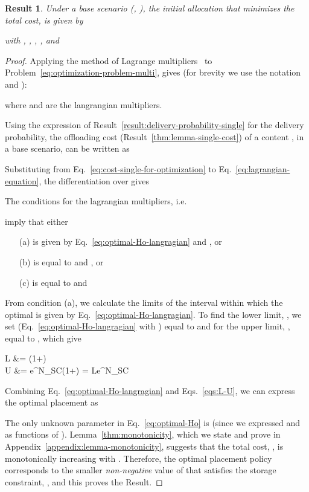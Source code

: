\documentclass[10pt,conference,letterpaper]{IEEEtran}
\newtheorem{result}{Result}
\newcommand{\eq}[1]{Eq.~\eqref{#1}}
\newcommand{\eqs}[1]{Eqs.~\eqref{#1}}
\begin{document}
\begin{result}\label{THM:OPTIMAL-H0-NO-COOP-MULTIPLE}
Under a base scenario (, ), the initial allocation  that minimizes the total cost, is given by

with  , , , , and 

\end{result}
\begin{proof}
Applying the method of Lagrange multipliers~\cite{practical-optimization-book} to Problem~\ref{eq:optimization-problem-multi}, gives (for brevity we use the notation  and ):

where  and  are the langrangian multipliers.

Using the expression of Result~\ref{result:delivery-probability-single} for the delivery probability, the offloading cost (Result~\ref{thm:lemma-single-cost}) of a content , in a base scenario, can be written as


Substituting  from \eq{eq:cost-single-for-optimization} to \eq{eq:lagrangian-equation}, the differentiation over  gives


\noindent The conditions for the lagrangian multipliers, i.e.

imply that  either 
\begin{itemize}
\item[(a)] is given by \eq{eq:optimal-Ho-langragian} and , or
\item[(b)] is equal to  and , or 
\item[(c)] is equal to  and  
\end{itemize}

From condition (a), we calculate the limits of the interval within which the optimal  is given by \eq{eq:optimal-Ho-langragian}. To find the lower limit, , we set  (\eq{eq:optimal-Ho-langragian} with ) equal to  and for the upper limit, , equal to , which give

 L &= \cdot\left(1+\right)		\label{eq:L-low-limit}\\
U &= \cdot e^{\gamma\cdot N_{SC}}\cdot\left(1+\right)		\label{eq:U-upper-limit}= L\cdot e^{\gamma\cdot N_{SC}}


Combining \eq{eq:optimal-Ho-langragian} and \eqs{eqs:L-U}, we can express the optimal placement as


The only unknown parameter in \eq{eq:optimal-Ho} is  (since we expressed  and  as functions of ). Lemma~\ref{thm:monotonicity}, which we state and prove in Appendix~\ref{appendix:lemma-monotonicity}, suggests that the total cost, , is monotonically increasing with . Therefore, the optimal placement policy corresponds to the smaller \textit{non-negative} value of  that satisfies the storage constraint, , and this proves the Result.
\end{proof}
\end{document}
